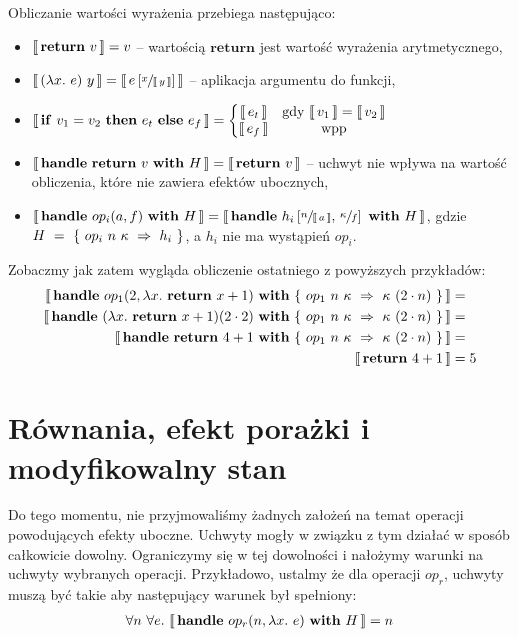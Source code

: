 Obliczanie wartości wyrażenia przebiega następująco:
\begin{itemize}
\item \(\llbracket\, \mathbf{return}\ v\, \rrbracket = v\) -- wartością \(\mathbf{return}\) jest wartość wyrażenia arytmetycznego,
\item \(\llbracket\, (\lambda x.\ e)\ y\, \rrbracket = \llbracket\, e \left[\sfrac{x}{\llbracket\, y\, \rrbracket}\right]\, \rrbracket\) -- aplikacja argumentu do funkcji,
\item
  \(\begin{aligned}[t]
    \llbracket\, \mathbf{if}\ v_1 = v_2\ \mathbf{then}\ e_t\ \mathbf{else}\ e_f\, \rrbracket = \left\{\begin{matrix}
    \llbracket\, e_t\, \rrbracket & \text{gdy }\llbracket\, v_1\, \rrbracket = \llbracket\, v_2\, \rrbracket \\ 
    \llbracket\, e_f\, \rrbracket & \text{wpp}
    \end{matrix}\right.
  \end{aligned}\)
\item \(\llbracket\, \mathbf{handle}\ \mathbf{return}\ v\ \mathbf{with}\ H\, \rrbracket = \llbracket\, \mathbf{return}\ v\, \rrbracket\) -- uchwyt nie wpływa na wartość obliczenia, które nie zawiera efektów ubocznych,
\item \(\llbracket\, \mathbf{handle}\ op_{i}(a, f)\ \mathbf{with}\ H\, \rrbracket = \llbracket\, \mathbf{handle}\ h_i \left[\sfrac{n}{\llbracket\, a\, \rrbracket},\, \sfrac{\kappa}{f}\right]\ \mathbf{with}\ H\, \rrbracket \), gdzie \(H~=~\{\ op_i\ n\ \kappa\ \Rightarrow\ h_i \ \}\), a \(h_i\) nie ma wystąpień \(op_i\).
  
\end{itemize}

Zobaczmy jak zatem wygląda obliczenie ostatniego z powyższych przykładów:
\begin{equation}\begin{split}
  \eval{\handle{\opi{1}{2}{\fun{x}{\return{x + 1}}}}{\{\ \hcase{op_1}{n\ \kappa}{\kappa\ (2 \cdot n)} \ \}}} &= \\
  \eval{\handle{(\fun{x}{\return{x+1}}) (2 \cdot 2)}{\{\ \hcase{op_1}{n\ \kappa}{\kappa\ (2 \cdot n)} \ \}}} &= \\
  \eval{\handle{\return{4+1}}{\{\ \hcase{op_1}{n\ \kappa}{\kappa\ (2 \cdot n)} \ \}}} &= \\
  \eval{\return{4 + 1}} &= 5
\end{split}\end{equation}


\section{Równania, efekt porażki i modyfikowalny stan}

Do tego momentu, nie przyjmowaliśmy żadnych założeń na temat operacji powodujących efekty uboczne. Uchwyty mogły w związku z tym działać w sposób całkowicie dowolny. Ograniczymy się w tej dowolności i nałożymy warunki na uchwyty wybranych operacji. Przykładowo, ustalmy że dla operacji \(op_r\), uchwyty muszą być takie aby następujący warunek był spełniony:
\begin{align}
  \forall n\ \forall e.\ \llbracket\, \mathbf{handle}\ op_r(n, \lambda x.\ e)\ \mathbf{with}\ H\, \rrbracket = n
\end{align}

